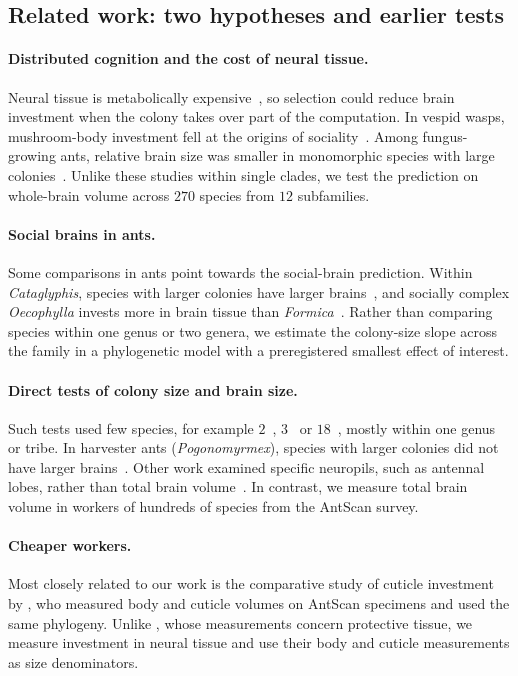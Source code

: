 \documentclass[11pt]{article}
\begin{document}
\subsection{Related work: two hypotheses and earlier tests}\label{sec:related}

\paragraph{Distributed cognition and the cost of neural tissue.} Neural tissue is metabolically
expensive~\citep{aiello1995,niven2008}, so selection could reduce brain investment when the colony takes over part of
the computation. In vespid wasps, mushroom-body investment fell at the origins of sociality~\citep{odonnell2015}.
Among fungus-growing ants, relative brain size was smaller in monomorphic species with large
colonies~\citep{riveros2012}. Unlike these studies within single clades, we test the prediction on whole-brain volume
across $270$ species from $12$ subfamilies.

\paragraph{Social brains in ants.} Some comparisons in ants point towards the social-brain prediction. Within
\emph{Cataglyphis}, species with larger colonies have larger brains~\citep{wehner2007}, and socially complex
\emph{Oecophylla} invests more in brain tissue than \emph{Formica}~\citep{kamhi2016}. Rather than comparing species
within one genus or two genera, we estimate the colony-size slope across the family in a phylogenetic model with a
preregistered smallest effect of interest.

\paragraph{Direct tests of colony size and brain size.} Such tests used few species, for example
$2$~\citep{kamhi2016}, $3$~\citep{godfrey2020} or $18$~\citep{riveros2012}, mostly within one genus or tribe. In
harvester ants (\emph{Pogonomyrmex}), species with larger colonies did not have larger brains~\citep{perl2026}. Other
work examined specific neuropils, such as antennal lobes, rather than total brain
volume~\citep{godfrey2020,marty2025}. In contrast, we measure total brain volume in workers of hundreds of species
from the AntScan survey.

\paragraph{Cheaper workers.} Most closely related to our work is the comparative study of cuticle investment by
\citet{matte2025}, who measured body and cuticle volumes on AntScan specimens and used the same phylogeny. Unlike
\citet{matte2025}, whose measurements concern protective tissue, we measure investment in neural tissue and use their
body and cuticle measurements as size denominators.
\end{document}
